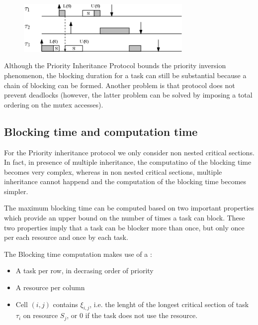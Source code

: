 \begin{figure}[!h]
    \centering
    \includegraphics[width =0.75\textwidth]{images/image09.png}
\end{figure}

Although the Priority Inheritance Protocol bounds the priority inversion phenomenon, the blocking duration for a task can still be substantial because a chain of blocking can be formed. Another problem is that protocol does not prevent deadlocks (however, the latter problem can be solved by imposing a total ordering on the mutex accesses).

\subsection{Blocking time and computation time}
For the Priority inheritance protocol we only consider non nested critical sections. In fact, in presence of multiple inheritance, the computatino of the blocking time becomes very complex, whereas in non nested critical sections, multiple inheritance cannot happend and the computation of the blocking time becomes simpler.

The maximum blocking time can be computed based on two important properties which provide an upper bound on the number of times a task can block.
These two properties imply that a task can be blocker more than once, but only once per each resource and once by each task.

The Blocking time computation makes use of a :
\begin{itemize}
    \item A task per row, in decrasing order of priority
    \item A resource per column
    \item Cell $(i,j)$ contains $\xi_{i,j}$, i.e. the lenght of the longest critical section of task $\tau_i$ on resource $S_j$, or 0 if the task does not use the resource.
\end{itemize}

